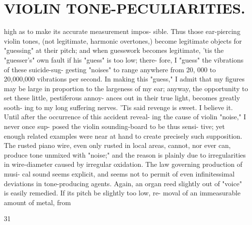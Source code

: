 \documentclass{article}
\begin{document}
\section*{VIOLIN TONE-PECULIARITIES.}
high as to make its accurate measurement impos- sible. Thus those ear-piercing violin tones, (not legitimate, harmonic overtones,) become legitimate objects for "guessing" at their pitch; and when guesswork becomes legitimate, 'tis the "guesser's" own fault if his "guess" is too low; there- fore, I "guess" the vibrations of these suicide-sug- gesting "noises" to range anywhere from 20, 000 to 20,000,000 vibrations per second. In making this "guess," I admit that my figures may be large in proportion to the largeness of my ear; anyway, the opportunity to set these little, pestiferous annoy- ances out in their true light, becomes greatly sooth- ing to my long suffering nerves. 'Tis said revenge is sweet. I believe it. Until after the occurrence of this accident reveal- ing the cause of violin "noise," I never once sup- posed the violin sounding-board to be thus sensi- tive; yet enough related examples were near at hand to create precisely such supposition. The rusted piano wire, even only rusted in local areas, cannot, nor ever can, produce tone unmixed with "noise;" and the reason is plainly due to irregularities in wire-diameter caused by irregular oxidation. The law governing production of musi- cal sound seems explicit, and seems not to permit of even infinitessimal deviations in tone-producing agents. Again, an organ reed slightly out of "voice" is easily remedied. If its pitch be slightly too low, re- moval of an immeasurable amount of metal, from

31
\end{document}
